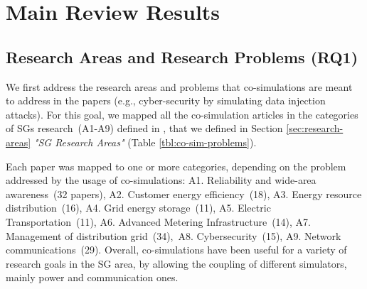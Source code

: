 \documentclass[1p]{elsarticle} %
\begin{document}
{{\begin{longtable}
 \label{tbl:co-sim-problems}


\end{longtable}
}
}


 
\section{Main Review Results}\label{sec:results}







\subsection{Research Areas and Research Problems (RQ1)}
We first address the research areas and problems that co-simulations are meant to address in the papers (e.g., cyber-security by simulating data injection attacks). For this goal, we mapped all the co-simulation articles in the categories of SGs research~(A1-A9) defined in \citet{ref:cintuglu2017survey}, that we defined in Section \ref{sec:research-areas} \textit{"SG Research Areas"} (Table \ref{tbl:co-sim-problems}). 

Each paper was mapped to one or more categories, depending on the problem addressed by the usage of co-simulations: A1. Reliability and wide-area awareness~(32 papers), A2. Customer energy efficiency~(18), A3. Energy resource distribution~(16), A4. Grid energy storage~(11), A5. Electric Transportation~(11), A6. Advanced Metering Infrastructure~(14), A7. Management of distribution grid~(34),~A8. Cybersecurity~(15), A9. Network communications~(29).
Overall, co-simulations have been useful for a variety of research goals in the SG area, by allowing the coupling of different simulators, mainly power and communication ones. 
\end{document}
